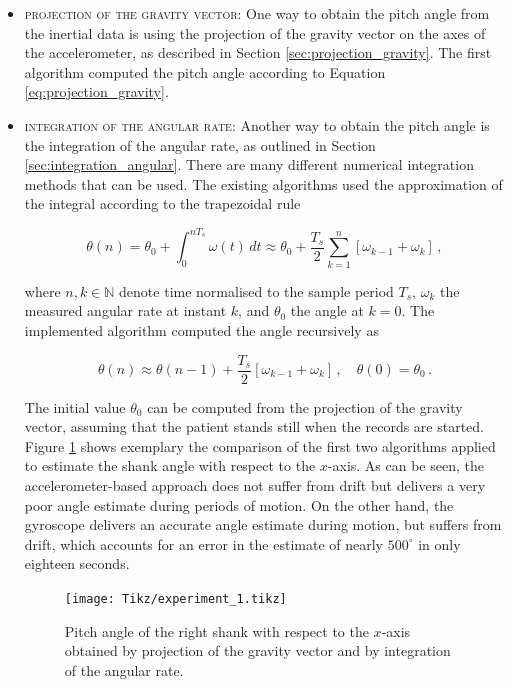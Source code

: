 \begin{itemize}
  \item \textsc{projection of the gravity vector:} One way to obtain the pitch angle from the inertial data is using the projection of the gravity vector on the axes of the accelerometer, as described in Section \ref{sec:projection_gravity}. The first algorithm computed the pitch angle according to Equation \ref{eq:projection_gravity}.
  
  \item \textsc{integration of the angular rate:} Another way to obtain the pitch angle is the integration of the angular rate, as outlined in Section \ref{sec:integration_angular}. There are many different numerical integration methods that can be used. The existing algorithms used the approximation of the integral according to the trapezoidal rule
  
  \begin{equation}
   \theta(n) = \theta_0 + \int_{0}^{n T_s} \omega(t)\, dt \approx \theta_0 + \frac{T_s}{2} \sum_{k=1}^{n} \left[ \omega_{k-1} + \omega_{k} \right]\,,
  \end{equation}
  
  \noindent
  where $n, k \in \mathbb{N}$ denote time normalised to the sample period $T_s$, $\omega_k$ the measured angular rate at instant $k$, and $\theta_0$ the angle at $k=0$. The implemented algorithm computed the angle recursively as
  
   \begin{equation}
   \theta(n) \approx \theta(n-1) + \frac{T_s}{2} \left[ \omega_{k-1} + \omega_{k} \right]\,, \quad \theta(0) = \theta_{0}\,.
  \end{equation}
  
  \noindent The initial value $\theta_{0}$ can be computed from the projection of the gravity vector, assuming that the patient stands still when the records are started. Figure \ref{fig:experiment_1} shows exemplary the comparison of the first two algorithms applied to estimate the shank angle with respect to the $x$-axis. As can be seen, the accelerometer-based approach does not suffer from drift but delivers a very poor angle estimate during periods of motion. On the other hand, the gyroscope delivers an accurate angle estimate during motion, but suffers from drift, which accounts for an error in the estimate of nearly $500^{\circ}$ in only eighteen seconds.
  
\begin{figure}
	\centering
	\newlength\figureheight 
	\newlength\figurewidth 
	\setlength\figureheight{7cm} 
	\setlength\figurewidth{\textwidth}
	\texttt{[image: Tikz/experiment\_1.tikz]}
	\caption{Pitch angle of the right shank with respect to the $x$-axis obtained by projection of the gravity vector and by integration of the angular rate.}
	\label{fig:experiment_1}
\end{figure}
  

\end{itemize}
